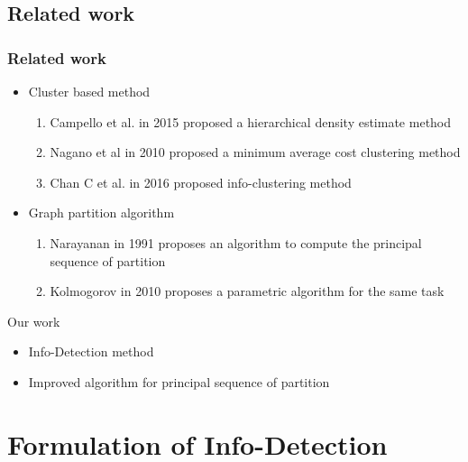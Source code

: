\documentclass[notheorems]{beamer}
\begin{document}
\subsection{Related work}
\begin{frame}
	\frametitle{Related work}
\begin{itemize}
\item Cluster based method
	\begin{enumerate}
		\item Campello et al. in 2015 proposed a hierarchical density estimate method \cite{RN432}
		\item Nagano et al in 2010 proposed a minimum average cost clustering method \cite{mac}
		\item Chan C et al. in 2016 proposed info-clustering method \cite{ic}
	\end{enumerate}
\item Graph partition algorithm
\begin{enumerate}
\item Narayanan in 1991 proposes an algorithm to compute the principal sequence of partition \cite{psp}
\item Kolmogorov in 2010 proposes a parametric algorithm for the same task \cite{pmf}
\end{enumerate}
\end{itemize}
Our work
\begin{itemize}
\item Info-Detection method
\item Improved algorithm for principal sequence of partition
\end{itemize}
\end{frame}
\section{Formulation of Info-Detection}
\end{document}
